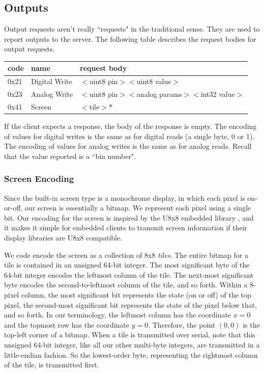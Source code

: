 \documentclass[12pt]{article}
\begin{document}
\begin{appendices}
\subsection{Outputs}
Output requests aren't really ``requests" in the traditional sense.  They are used to report outputs to the server.  The following table describes the request bodies for output requests.

\begin{center}
\begin{tabular}{l l l}
code & name & request body \\ \hline
0x21 & Digital Write & $<$uint8 pin$>$$<$uint8 value$>$ \\
0x23 & Analog Write & $<$uint8 pin$>$$<$analog params$>$$<$int32 value$>$ \\
0x41 & Screen & $<$tile$>$* \\
\end{tabular}
\end{center}

\vspace{5mm}

If the client expects a response, the body of the response is empty.  The encoding of values for digital writes is the same as for digital reads (a single byte, 0 or 1).  The encoding of values for analog writes is the same as for analog reads.  Recall that the value reported is a ``bin number".

\subsubsection{Screen Encoding}
Since the built-in screen type is a monochrome display, in which each pixel is on-or-off, our screen is essentially a bitmap.  We represent each pixel using a single bit.  Our encoding for the screen is inspired by the U8x8 embedded library \cite{u8x8}, and it makes it simple for embedded clients to transmit screen information if their display libraries are U8x8 compatible.

We code encode the screen as a collection of 8x8 \textit{tiles}.  The entire bitmap for a tile is contained in an unsigned 64-bit integer.  The most significant byte of the 64-bit integer encodes the leftmost column of the tile.  The next-most significant byte encodes the second-to-leftmost column of the tile, and so forth.  Within a 8-pixel column, the most significant bit represents the state (on or off) of the top pixel, the second-most significant bit represents the state of the pixel below that, and so forth.  In our terminology, the leftmost column has the coordinate $x=0$ and the topmost row has the coordinate $y=0$.  Therefore, the point $(0, 0)$ is the top-left corner of a bitmap.  When a tile is transmitted over serial, note that this unsigned 64-bit integer, like all our other multi-byte integers, are transmitted in a little-endian fashion.  So the lowest-order byte, representing the rightmost column of the tile, is transmitted first.


\end{appendices}
\end{document}
